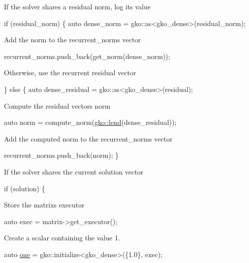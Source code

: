 If the solver shares a residual norm, log its value


\begin{DoxyCode}
\textcolor{keywordflow}{if} (residual\_norm) \{
    \textcolor{keyword}{auto} dense\_norm = gko::as<gko\_dense>(residual\_norm);
\end{DoxyCode}


Add the norm to the {\ttfamily recurrent\+\_\+norms} vector


\begin{DoxyCode}
recurrent\_norms.push\_back(get\_norm(dense\_norm));
\end{DoxyCode}


Otherwise, use the recurrent residual vector


\begin{DoxyCode}
\} \textcolor{keywordflow}{else} \{
    \textcolor{keyword}{auto} dense\_residual = gko::as<gko\_dense>(residual);
\end{DoxyCode}


Compute the residual vector\textquotesingle{}s norm


\begin{DoxyCode}
\textcolor{keyword}{auto} norm = compute\_norm(\hyperlink{namespacegko_aa8cb4876b72e5e1036ea9575443c439b}{gko::lend}(dense\_residual));
\end{DoxyCode}


Add the computed norm to the {\ttfamily recurrent\+\_\+norms} vector


\begin{DoxyCode}
    recurrent\_norms.push\_back(norm);
\}
\end{DoxyCode}


If the solver shares the current solution vector


\begin{DoxyCode}
\textcolor{keywordflow}{if} (solution) \{
\end{DoxyCode}


Store the matrix\textquotesingle{}s executor


\begin{DoxyCode}
\textcolor{keyword}{auto} exec = matrix->get\_executor();
\end{DoxyCode}


Create a scalar containing the value 1.


\begin{DoxyCode}
\textcolor{keyword}{auto} \hyperlink{namespacegko_a0059e27f8f4bc348ff65c1e60caf47c8}{one} = gko::initialize<gko\_dense>(\{1.0\}, exec);
\end{DoxyCode}


